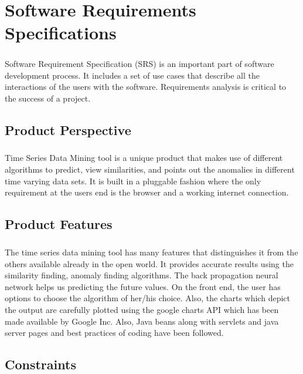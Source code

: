 \documentclass[12pt,a4paper]{report}
\begin{document}
\chapter{Software Requirements Specifications}

\paragraph{}Software Requirement Specification (SRS) is an important part of software development process. It includes a set of use cases that describe all the interactions of the users with the software. Requirements analysis is critical to the success of a project. \\

\section{Product Perspective}

\paragraph{} Time Series Data Mining tool is a unique product that makes use of different algorithms to predict, view similarities, and points out the anomalies in different time varying data sets. It is built in a pluggable fashion where the only requirement at the users end is the browser and a working internet connection. 
\section{Product Features}
\paragraph{} 
The time series data mining tool has many features that distinguishes it from the others available already in the open world. It provides accurate results using the similarity finding, anomaly finding algorithms. The back propagation neural network helps us predicting the future values. On the front end, the user has options to choose the algorithm of her/his choice. Also, the charts which depict the output are carefully plotted using the google charts API which has been made available by Google Inc. Also, Java beans along with servlets and java server pages and best practices of coding have been followed. 
 
\section{Constraints}
\end{document}
